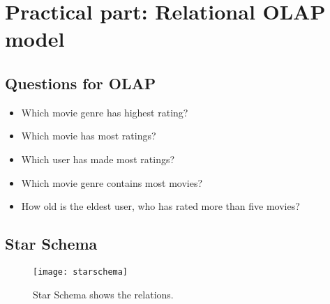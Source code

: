 \section{Practical part: Relational OLAP model}

\subsection{Questions for OLAP}
\begin{itemize}
	\item Which movie genre has highest rating?
	\item Which movie has most ratings?
	\item Which user has made most ratings?
	\item Which movie genre contains most movies?
	\item How old is the eldest user, who has rated more than five movies?
\end{itemize}

\subsection{Star Schema}

\begin{figure}[H]
	\centering
	\texttt{[image: starschema]}
	\caption[Star Schema shows the relations.]{Star Schema shows the relations.}
	\label{fig:starschema}
\end{figure}
